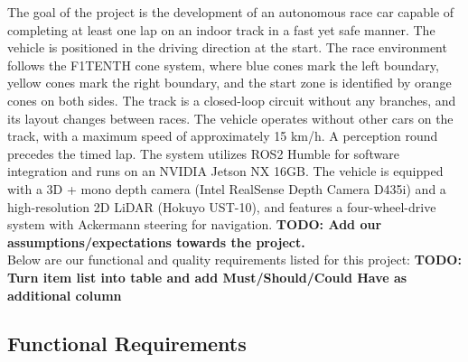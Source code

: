 The goal of the project is the development of an autonomous race car capable of completing at least one lap on an indoor track in a fast yet safe manner.
The vehicle is positioned in the driving direction at the start. The race environment follows the F1TENTH cone system, where blue cones mark the left boundary, yellow cones mark the right boundary, and the start zone is identified by orange cones on both sides.
The track is a closed-loop circuit without any branches, and its layout changes between races. The vehicle operates without other cars on the track, with a maximum speed of approximately 15 km/h. 
A perception round precedes the timed lap. The system utilizes ROS2 Humble for software integration and runs on an NVIDIA Jetson NX 16GB. The vehicle is equipped with a 3D + mono depth camera (Intel RealSense Depth Camera D435i) and a high-resolution 2D LiDAR (Hokuyo UST-10), and features a four-wheel-drive system with Ackermann steering for navigation. \textbf{TODO: Add our assumptions/expectations towards the project.}\\
\newline
Below are our functional and quality requirements listed for this project:
\textbf{TODO: Turn item list into table and add Must/Should/Could Have as additional column}
\subsection{Functional Requirements}

